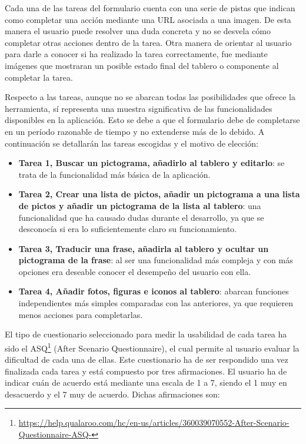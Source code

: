 Cada una de las tareas del formulario cuenta con una serie de pistas que indican como completar una acción mediante una URL asociada a una imagen. De esta manera el usuario puede resolver una duda concreta y no se desvela cómo completar otras acciones dentro de la tarea. Otra manera de orientar al usuario para darle a conocer si ha realizado la tarea correctamente, fue mediante imágenes que mostraran un posible estado final del tablero o componente al completar la tarea.


Respecto a las tareas, aunque no se abarcan todas las posibilidades que ofrece la herramienta, sí representa una muestra significativa de las funcionalidades disponibles en la aplicación. Esto se debe a que el formulario debe de completarse en un período razonable de tiempo y no extenderse más de lo debido. 
A continuación se detallarán las tareas escogidas y el motivo de elección: 

\begin{itemize}
	\item \textbf{Tarea 1, Buscar un pictograma, añadirlo al tablero y editarlo}: se trata de la funcionalidad más básica de la aplicación.
	\item \textbf{Tarea 2, Crear una lista de pictos, añadir un pictograma a una lista de pictos y añadir un pictograma de la lista al tablero}: una funcionalidad que ha causado dudas durante el desarrollo, ya que se desconocía si era lo suficientemente claro su funcionamiento.
	\item \textbf{Tarea 3, Traducir una frase, añadirla al tablero y ocultar un pictograma de la frase}: al ser una funcionalidad más compleja y con más opciones era deseable conocer el desempeño del usuario con ella.
	\item \textbf{Tarea 4, Añadir fotos, figuras e iconos al tablero}: abarcan funciones independientes más simples comparadas con las anteriores, ya que requieren menos acciones para completarlas.
\end{itemize}
El tipo de cuestionario seleccionado para medir la usabilidad de cada tarea ha sido el ASQ\footnote{\url{https://help.qualaroo.com/hc/en-us/articles/360039070552-After-Scenario-Questionnaire-ASQ-}} (After Scenario Questionnaire), el cual permite al usuario evaluar la dificultad de cada una de ellas. Este cuestionario ha de ser respondido una vez finalizada cada tarea y está compuesto por tres afirmaciones. El usuario ha de indicar cuán de acuerdo está mediante una escala de 1 a 7, siendo el 1 muy en desacuerdo y el 7 muy de acuerdo. Dichas afirmaciones son: 

